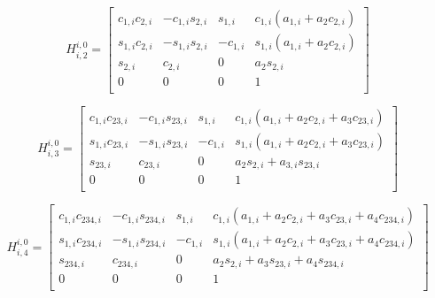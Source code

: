 				\begin{equation}
					H^{i,0}_{i,2} =\left[ 
					\begin{array}{ccc|c}
						c_{1,i} c_{2,i}	&  		-c_{1,i} s_{2,i}	& 		s_{1,i}		&	c_{1,i}( a_{1,i} + a_2 c_{2,i} )\\
						s_{1,i} c_{2,i}	&  		-s_{1,i} s_{2,i}	& 		-c_{1,i}	&	s_{1,i}( a_{1,i} + a_2 c_{2,i} )\\
						s_{2,i} 		&  		c_{2,i}			 	& 		0			&	a_2 s_{2,i} 					\\ \hline
						0 			&  		0			 		& 		0			&	1 								\\
					\end{array} 
					\right]
				\end{equation}


				\begin{equation}
					H^{i,0}_{i,3} =\left[ 
					\begin{array}{ccc|c}
						c_{1,i} c_{23,i}	&  		-c_{1,i} s_{23,i}	& 		s_{1,i}		&		c_{1,i}( a_{1,i} + a_2 c_{2,i} + a_3 c_{23,i} )	\\
						s_{1,i} c_{23,i}	&  		-s_{1,i} s_{23,i}	& 		-c_{1,i}	&		s_{1,i}( a_{1,i} + a_2 c_{2,i} + a_3 c_{23,i} )	\\
						s_{23,i} 		&  		c_{23,i}			& 		0			&		a_2 s_{2,i} + a_{3,i} s_{23,i}			\\ \hline
						0 			&  		0					& 		0			&		1 										\\
					\end{array} 
					\right]
				\end{equation}

				\begin{equation}
					H^{i,0}_{i,4} =\left[ 
					\begin{array}{ccc|c}
						c_{1,i} c_{234,i}	&  		-c_{1,i} s_{234,i}	& 		s_{1,i}		&		c_{1,i}( a_{1,i} + a_2 c_{2,i} + a_3 c_{23,i} + a_4 c_{234,i} )		\\
						s_{1,i} c_{234,i}	&  		-s_{1,i} s_{234,i}	& 		-c_{1,i}	&		s_{1,i}( a_{1,i} + a_2 c_{2,i} + a_3 c_{23,i} + a_4 c_{234,i} )		\\
						s_{234,i} 		&  		c_{234,i}		& 		0			&		a_2 s_{2,i} + a_3 s_{23,i} + a_4 s_{234,i}					\\ \hline
						0 			& 		0			& 		0			&		1 															\\
					\end{array} 
					\right]
				\end{equation}


